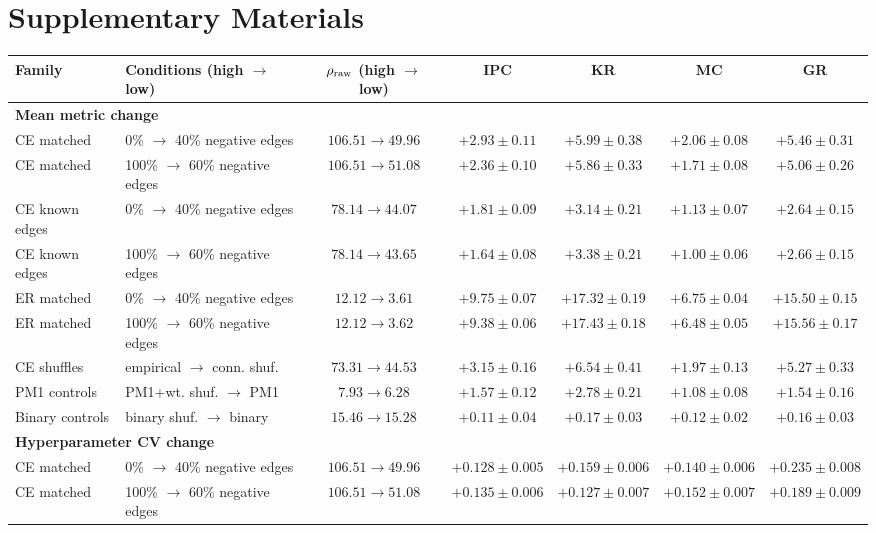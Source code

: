 \documentclass[mlabstract,onecolumn]{jmlr}
\begin{document}
\section{Supplementary Materials}
\begin{table}[h]
\centering\scriptsize
\setlength{\tabcolsep}{2pt}
\begin{tabular}{llccccc}
\hline
Family & Conditions (high $\to$ low) & $\rho_{\rm raw}$ (high $\to$ low) & IPC & KR & MC & GR \\
\hline
\multicolumn{7}{l}{\textbf{Mean metric change}} \\
CE matched & 0\% $\to$ 40\% negative edges & $106.51\to49.96$ & $+2.93\pm0.11$ & $+5.99\pm0.38$ & $+2.06\pm0.08$ & $+5.46\pm0.31$ \\
CE matched & 100\% $\to$ 60\% negative edges & $106.51\to51.08$ & $+2.36\pm0.10$ & $+5.86\pm0.33$ & $+1.71\pm0.08$ & $+5.06\pm0.26$ \\
CE known edges & 0\% $\to$ 40\% negative edges & $78.14\to44.07$ & $+1.81\pm0.09$ & $+3.14\pm0.21$ & $+1.13\pm0.07$ & $+2.64\pm0.15$ \\
CE known edges & 100\% $\to$ 60\% negative edges & $78.14\to43.65$ & $+1.64\pm0.08$ & $+3.38\pm0.21$ & $+1.00\pm0.06$ & $+2.66\pm0.15$ \\
ER matched & 0\% $\to$ 40\% negative edges & $12.12\to3.61$ & $+9.75\pm0.07$ & $+17.32\pm0.19$ & $+6.75\pm0.04$ & $+15.50\pm0.15$ \\
ER matched & 100\% $\to$ 60\% negative edges & $12.12\to3.62$ & $+9.38\pm0.06$ & $+17.43\pm0.18$ & $+6.48\pm0.05$ & $+15.56\pm0.17$ \\
CE shuffles & empirical $\to$ conn. shuf. & $73.31\to44.53$ & $+3.15\pm0.16$ & $+6.54\pm0.41$ & $+1.97\pm0.13$ & $+5.27\pm0.33$ \\
PM1 controls & PM1+wt. shuf. $\to$ PM1 & $7.93\to6.28$ & $+1.57\pm0.12$ & $+2.78\pm0.21$ & $+1.08\pm0.08$ & $+1.54\pm0.16$ \\
Binary controls & binary shuf. $\to$ binary & $15.46\to15.28$ & $+0.11\pm0.04$ & $+0.17\pm0.03$ & $+0.12\pm0.02$ & $+0.16\pm0.03$ \\
\hline
\multicolumn{7}{l}{\textbf{Hyperparameter CV change}} \\
CE matched & 0\% $\to$ 40\% negative edges & $106.51\to49.96$ & $+0.128\pm0.005$ & $+0.159\pm0.006$ & $+0.140\pm0.006$ & $+0.235\pm0.008$ \\
CE matched & 100\% $\to$ 60\% negative edges & $106.51\to51.08$ & $+0.135\pm0.006$ & $+0.127\pm0.007$ & $+0.152\pm0.007$ & $+0.189\pm0.009$ \\

\end{tabular}
\end{table}
\end{document}
